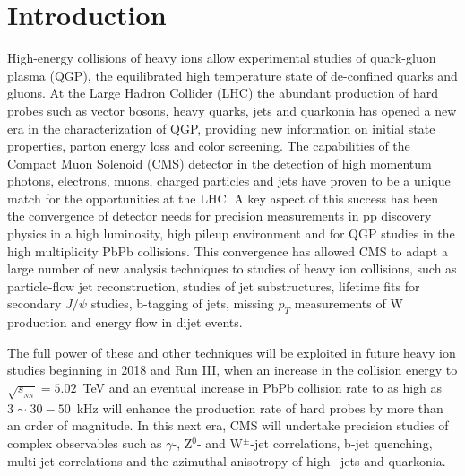 \section{Introduction}
\label{sec:intro}

High-energy collisions of heavy ions allow experimental studies of quark-gluon plasma (QGP), the 
equilibrated high temperature state of de-confined quarks and gluons. At the Large Hadron Collider (LHC) the abundant production of hard probes such as vector bosons, heavy quarks, jets and quarkonia has opened a new era in the characterization of QGP, providing new information on initial state properties, parton energy loss and color screening.  The capabilities of the Compact Muon Solenoid (CMS) detector in the detection of 
high momentum photons, electrons, muons, charged particles and jets have proven to be a unique match for the opportunities at the LHC. A key aspect of this success has been the convergence of detector needs for precision measurements in pp discovery physics in a high luminosity, high pileup environment and for QGP studies in the high multiplicity PbPb collisions. This convergence has allowed CMS to adapt a large number of new analysis techniques to studies of heavy ion collisions, such as particle-flow jet reconstruction, studies of jet substructures, lifetime fits for secondary $J/\psi$ studies,  b-tagging of jets, missing $p_T$ measurements of W production and energy flow in dijet events. 

The full power of these and other techniques will be exploited in future heavy ion studies beginning in 2018 and Run III, when an increase in the collision energy to $\sqrt{s_{_{NN}}} = 5.02$~TeV and an eventual increase in PbPb collision rate to as high as $3\sim 30-50$~kHz will enhance the production rate of hard probes by more than an order of magnitude. In this next era, CMS will undertake precision studies of complex observables such as $\gamma$-, Z$^0$- and W$^\pm$-jet correlations, b-jet quenching, multi-jet correlations and the azimuthal anisotropy of high \pt\ jets and quarkonia. 

